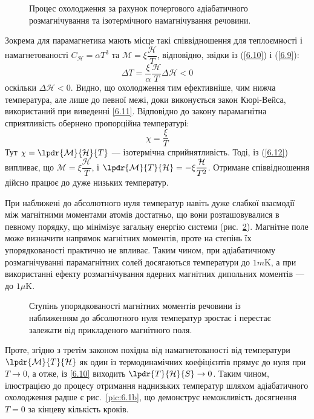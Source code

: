 \begin{figure}[h!]\centering

\caption{Процес охолодження за рахунок почергового адіабатичного розмагнічування та ізотермічного намагнічування речовини.}
\label{pic:6.2}
\end{figure}


Зокрема для парамагнетика мають місце такі співвідношення для теплоємності і намагнетованості $C_{\mathcal{H}}=\alpha T^{3}$ та $\mathcal{M} = \xi \dfrac{\mathcal{H}}{T}$, відповідно, звідки із (\ref{6.10}) і (\ref{6.9}):
\begin{equation}\label{6.11}
	\Delta T = \dfrac{\xi}{\alpha}\dfrac{\mathcal{H}}{T}\Delta \mathcal{H}<0
\end{equation}
оскільки $\Delta \mathcal{H}<0$. Видно, що охолодження тим ефективніше, чим нижча температура, але лише до певної межі, доки виконується закон Кюрі-Вейса, використаний при виведенні \eqref{6.11}. Відповідно до закону парамагнітна сприятливість обернено пропорційна температурі:
\begin{equation}\label{6.12}
	\chi = \dfrac{\xi}{T}
\end{equation}
Тут $\chi=\lpdr{\mathcal{M}}{\mathcal{H}}{T}$ --- ізотермічна сприйнятливість. Тоді, із (\ref{6.12}) випливає, що $\mathcal{M} = \xi\dfrac{\mathcal{H}}{T}$, і $\lpdr{ \mathcal{M}}{T}{\mathcal{H}}=-\xi\dfrac{\mathcal{H}}{T^2}$. Отримане співвідношення дійсно працює до дуже низьких температур.

При наближені до абсолютного нуля температур навіть дуже слабкої взаємодії між магнітними моментами атомів достатньо, що вони розташовувалися в певному порядку, що мінімізує загальну енергію системи (рис.~\ref{pic:6.3}). Магнітне поле може визначити напрямок магнітних моментів, проте на степінь їх упорядкованості практично не впливає. Таким чином, при адіабатичному розмагнічуванні парамагнітних солей досягаються температури до $1m$K, а при використанні ефекту розмагнічування ядерних магнітних дипольних моментів --- до $1\mu$K.

\begin{figure}[h!]\centering

\caption{Ступінь упорядкованості магнітних моментів речовини із наближенням до абсолютного нуля температур зростає і перестає залежати від прикладеного магнітного поля.}
\label{pic:6.3}
\end{figure}


Проте, згідно з третім законом похідна від намагнетованості від температури $\lpdr{\mathcal{M}}{T}{\mathcal{H}}$  як один із термодинамічних коефіцієнтів прямує до нуля при  $T\rightarrow0$,  а отже, із \eqref{6.10} виходить  $\lpdr{T}{\mathcal{H}}{S}\rightarrow0$. Таким чином, ілюстрацією до процесу отримання наднизьких температур шляхом адіабатичного охолодження радше є рис.~\ref{pic:6.1b}, що демонструє неможливість досягнення $T=0$ за кінцеву кількість кроків.